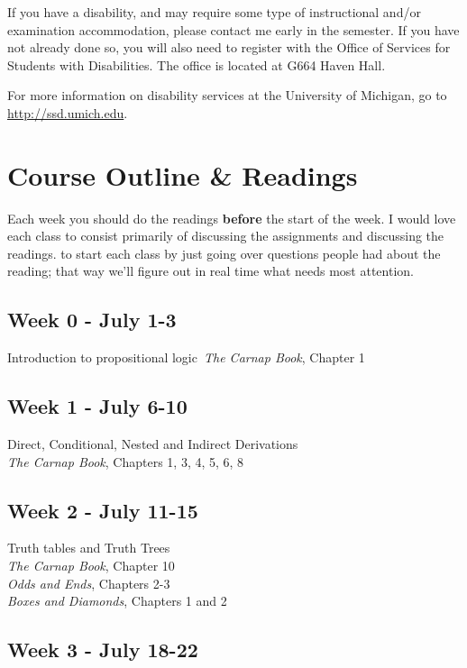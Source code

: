 \documentclass[10pt]{article}
\begin{document}
If you have a disability, and may require some type of instructional and\slash or examination accommodation, please contact me early in the semester. If you have not already done so, you will also need to register with the Office of Services for Students with Disabilities. The office is located at G664 Haven Hall. \smallskip

For more information on disability services at the University of Michigan, go to \url{http://ssd.umich.edu}. 

\newpage
\section*{Course Outline \& Readings}

Each week you should do the readings \textbf{before} the start of the week. I would love each class to consist primarily of discussing the assignments and discussing the readings. to start each class by just going over questions people had about the reading; that way we'll figure out in real time what needs most attention. 

\subsection*{Week 0 - July 1-3}

Introduction to propositional logic\
\textit{The Carnap Book}, Chapter 1

\subsection*{Week 1 - July 6-10}

Direct, Conditional, Nested and Indirect Derivations \\
\textit{The Carnap Book}, Chapters 1, 3, 4, 5, 6, 8

\subsection*{Week 2 - July 11-15}

Truth tables and Truth Trees \\
\textit{The Carnap Book}, Chapter 10 \\
\textit{Odds and Ends}, Chapters 2-3 \\
\textit{Boxes and Diamonds}, Chapters 1 and 2

\subsection*{Week 3 - July 18-22}
\end{document}
